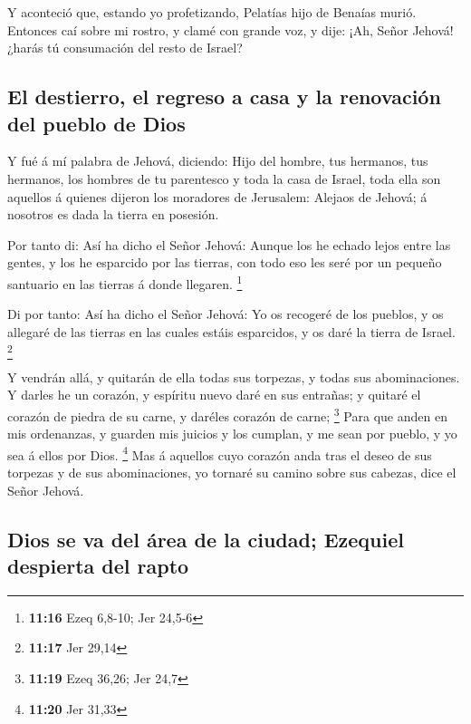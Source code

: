  Y aconteció que, estando yo profetizando, Pelatías hijo de
Benaías murió. Entonces caí sobre mi rostro, y clamé con grande voz, y
dije: ¡Ah, Señor Jehová! ¿harás tú consumación del resto de Israel?

\hypertarget{el-destierro-el-regreso-a-casa-y-la-renovaciuxf3n-del-pueblo-de-dios}{%
\subsection{El destierro, el regreso a casa y la renovación del pueblo
de
Dios}\label{el-destierro-el-regreso-a-casa-y-la-renovaciuxf3n-del-pueblo-de-dios}}

 Y fué á mí palabra de Jehová, diciendo:  Hijo
del hombre, tus hermanos, tus hermanos, los hombres de tu parentesco y
toda la casa de Israel, toda ella son aquellos á quienes dijeron los
moradores de Jerusalem: Alejaos de Jehová; á nosotros es dada la tierra
en posesión.

 Por tanto di: Así ha dicho el Señor Jehová: Aunque los he
echado lejos entre las gentes, y los he esparcido por las tierras, con
todo eso les seré por un pequeño santuario en las tierras á donde
llegaren. \footnote{\textbf{11:16} Ezeq 6,8-10; Jer 24,5-6}

 Di por tanto: Así ha dicho el Señor Jehová: Yo os recogeré
de los pueblos, y os allegaré de las tierras en las cuales estáis
esparcidos, y os daré la tierra de Israel. \footnote{\textbf{11:17} Jer
  29,14}

 Y vendrán allá, y quitarán de ella todas sus torpezas, y
todas sus abominaciones.  Y darles he un corazón, y
espíritu nuevo daré en sus entrañas; y quitaré el corazón de piedra de
su carne, y daréles corazón de carne; \footnote{\textbf{11:19} Ezeq
  36,26; Jer 24,7}  Para que anden en mis ordenanzas, y
guarden mis juicios y los cumplan, y me sean por pueblo, y yo sea á
ellos por Dios. \footnote{\textbf{11:20} Jer 31,33}  Mas á
aquellos cuyo corazón anda tras el deseo de sus torpezas y de sus
abominaciones, yo tornaré su camino sobre sus cabezas, dice el Señor
Jehová.

\hypertarget{dios-se-va-del-uxe1rea-de-la-ciudad-ezequiel-despierta-del-rapto}{%
\subsection{Dios se va del área de la ciudad; Ezequiel despierta del
rapto}\label{dios-se-va-del-uxe1rea-de-la-ciudad-ezequiel-despierta-del-rapto}}

